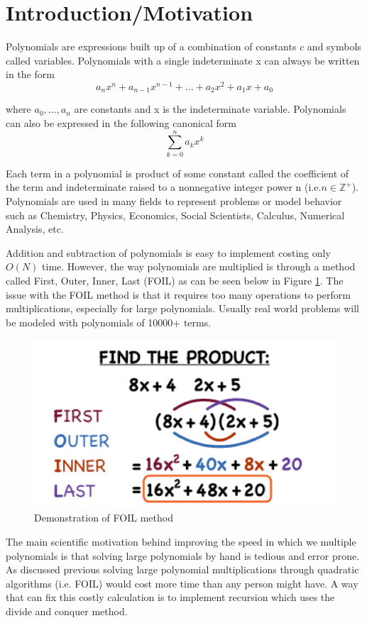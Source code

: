 \documentclass[12pt]{article}
\begin{document}
        \section{Introduction/Motivation}
        \indent\par{Polynomials are expressions built up of a combination of constants $c$ and symbols called variables. Polynomials with a single indeterminate x can always be written in the form }
        $$a_nx^n + a_{n-1}x^{n-1} + ... + a_2x^2 + a_1x + a_0$$
        \par{where $a_0,...,a_n$ are constants and x is the indeterminate variable. Polynomials can also be expressed in the following canonical form}
        $$ \sum_{k=0}^{n}a_kx^k $$
        \indent\par{Each term in a polynomial is product of some constant called the coefficient of the term and indeterminate raised to a nonnegative integer power n (i.e.$n\in\mathbb{Z}^+$). Polynomials are used in many fields to represent problems or model behavior such as Chemistry, Physics, Economics, Social Scientists, Calculus, Numerical Analysis, etc.}
        \indent\par{Addition and subtraction of polynomials is easy to implement costing only $O(N)$ time. However, the way polynomials are multiplied is through a method called First, Outer, Inner, Last (FOIL) as can be seen below in Figure \ref{fig:foil}. The issue with the FOIL method is that it requires too many operations to perform multiplications, especially for large polynomials. Usually real world problems will be modeled with polynomials of 10000+ terms.}
        \begin{figure}[H]
        	\centerline{\includegraphics[scale=0.5]{images/FOIL}}
        	\caption{Demonstration of FOIL method}
        	\label{fig:foil}
        \end{figure}
    	\indent\par{The main scientific motivation behind improving the speed in which we multiple polynomials is that solving large polynomials by hand is tedious and error prone. As discussed previous solving large polynomial multiplications through quadratic algorithms (i.e. FOIL) would cost more time than any person might have. A way that can fix this costly calculation is to implement recursion which uses the divide and conquer method.}
    	 
\end{document}

